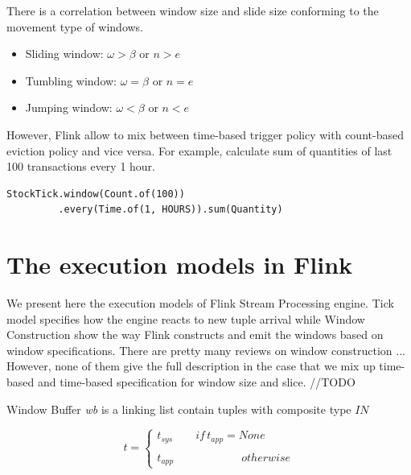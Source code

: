 There is a correlation between window size and slide size  conforming to the movement type of windows.
\begin{itemize}
\item Sliding window: $\omega > \beta$ or $n > e$
\item Tumbling window: $\omega = \beta$ or $n = e$
\item Jumping window: $\omega < \beta$ or $n < e$
\end{itemize}

However, Flink allow to mix between time-based trigger policy with count-based eviction policy and vice versa. For example,
calculate sum of quantities of last 100 transactions every 1 hour.
\begin{verbatim}
StockTick.window(Count.of(100))
		 .every(Time.of(1, HOURS)).sum(Quantity)
\end{verbatim}

\section{The execution models in Flink}
We present here the execution models of Flink Stream Processing engine. Tick model specifies how the engine reacts to new tuple arrival while Window Construction show the way Flink constructs and emit the windows based on window specifications. There are pretty many reviews on window construction ... However, none of them give the full description in the case that we mix up time-based and time-based specification for window size and slice.  //TODO



%
%
%
%
%

Window Buffer \textit{wb} is a linking list contain tuples with composite type $IN$



\begin{equation}
	t = 
	\begin{cases}
		t_{sys} \qquad if\,t_{app} = None\\
		   \\
		t_{app} \qquad\qquad\qquad otherwise
	\end{cases}
\end{equation}

